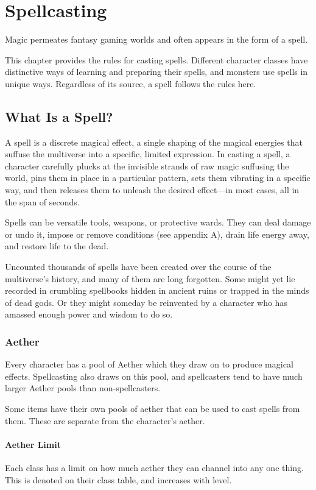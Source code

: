 \chapter{Spellcasting}\label{ch:spellcasting}
Magic permeates fantasy gaming worlds and often appears in the form of a spell.

This chapter provides the rules for casting spells. Different character classes have distinctive ways of learning and preparing their spells, and monsters use spells in unique ways. Regardless of its source, a spell follows the rules here.

\section{What Is a Spell?}

A spell is a discrete magical effect, a single shaping of the magical energies that suffuse the multiverse into a specific, limited expression. In casting a spell, a character carefully plucks at the invisible strands of raw magic suffusing the world, pins them in place in a particular pattern, sets them vibrating in a specific way, and then releases them to unleash the desired effect—in most cases, all in the span of seconds.

Spells can be versatile tools, weapons, or protective wards. They can deal damage or undo it, impose or remove conditions (see appendix A), drain life energy away, and restore life to the dead.

Uncounted thousands of spells have been created over the course of the multiverse's history, and many of them are long forgotten. Some might yet lie recorded in crumbling spellbooks hidden in ancient ruins or trapped in the minds of dead gods. Or they might someday be reinvented by a character who has amassed enough power and wisdom to do so.

\subsection{Aether}
Every character has a pool of Aether which they draw on to produce magical effects. Spellcasting also draws on this pool, and spellcasters tend to have much larger Aether pools than non-spellcasters.

Some items have their own pools of aether that can be used to cast spells from them. These are separate from the character's aether.

\subsubsection{Aether Limit}
Each class has a limit on how much aether they can channel into any one thing. This is denoted on their class table, and increases with level.

